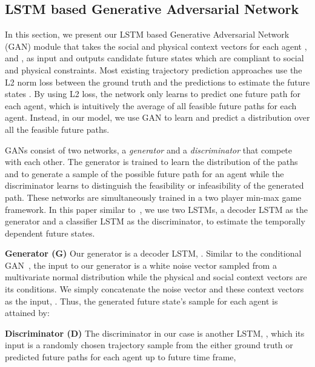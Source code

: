 \documentclass[10pt,twocolumn,letterpaper]{article}
\begin{document}
\subsection{LSTM based Generative Adversarial Network}
\label{sec:Generator}
In this section, we present our LSTM based Generative Adversarial Network (GAN) module that takes the social and physical context vectors for each agent ,  and , as input and outputs candidate future states which are compliant to social and physical constraints. Most existing trajectory prediction approaches use the L2 norm loss between the ground truth and the predictions to estimate the future states \cite{sadeghian2017car}. By using L2 loss, the network only learns to predict one future path for each agent, which is intuitively the average of all feasible future paths for each agent. Instead, in our model, we use GAN to learn and predict a distribution over all the feasible future paths.

GANs consist of two networks, a \emph{generator} and a \emph{discriminator} that compete with each other. The generator is trained to learn the distribution of the paths and to generate a sample of the possible future path for an agent while the discriminator learns to distinguish the feasibility or infeasibility of the generated path. These networks are simultaneously trained in a two player min-max game framework. In this paper similar to~\cite{gupta2018social}, we use two LSTMs, a decoder LSTM as the generator and a classifier LSTM as the discriminator, to estimate the temporally dependent future states.




\textbf{Generator (G)} Our generator is a decoder LSTM, . Similar to the conditional GAN~\cite{mirza2014conditional}, the input to our generator is a white noise vector  sampled from a multivariate normal distribution while the physical and social context vectors are its conditions. We simply concatenate the noise vector  and these context vectors as the input, \ie . Thus, the generated  future state's sample for each agent is attained by:










\textbf{Discriminator (D)}
The discriminator in our case is another LSTM, , which its input is a randomly chosen trajectory sample from the either ground truth or predicted future paths for each agent up to  future time frame, \ie  
\end{document}
